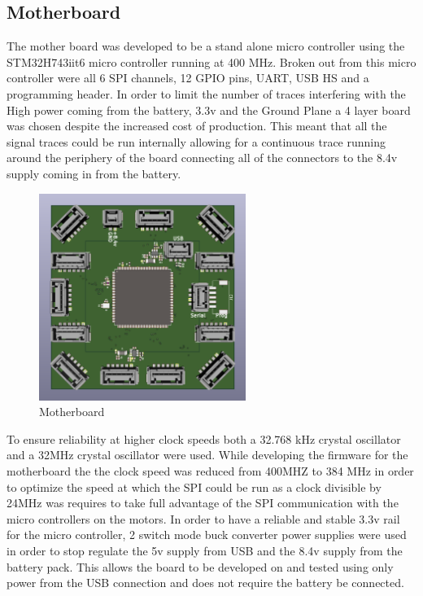 \subsection{Motherboard}
The mother board was developed to be a stand alone micro controller using the STM32H743iit6 micro controller running at 400 MHz. Broken out from this micro controller were all 6 SPI channels, 12 GPIO pins, UART, USB HS and a programming header. In order to limit the number of traces interfering with the High power  coming from the battery, 3.3v and the Ground Plane a 4 layer board was chosen despite the increased cost of production. This meant that all the signal traces could be run internally allowing for a continuous trace running around the periphery of the board connecting all of the connectors to the 8.4v supply coming in from the battery.
\begin{figure}[H]
       \centering
       \includegraphics[width=0.6\textwidth]{figures/Motherboard.png}
       \caption{Motherboard}
       \label{fig:my_label}
   \end{figure}
To ensure reliability at higher clock speeds both a 32.768 kHz crystal oscillator and a 32MHz crystal oscillator were used. While developing the firmware for the motherboard the the clock speed was reduced from 400MHZ to 384 MHz in order to optimize the speed at which the SPI could be run as a clock divisible by 24MHz was requires to take full advantage of the SPI communication with the micro controllers on the motors. In order to have a reliable and stable 3.3v rail for the micro controller, 2 switch mode buck converter power supplies were used in order to stop regulate the 5v supply from USB and the 8.4v supply from the battery pack. This allows the board to be developed on and tested using only power from the USB connection and does not require the battery be connected. 
  
